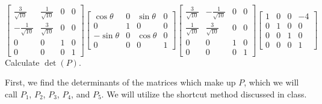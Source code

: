 \documentclass[11pt]{article}
\begin{document}
\begin{enumerate}[label=\textbf{\arabic*.}]
{\begin{enumerate}[label=\textbf{(\alph*)}]
{{{$$                        \begin{bmatrix}
                            \frac{3}{\sqrt{10}}  & \frac{1}{\sqrt{10}} & 0 & 0 \\
                            -\frac{1}{\sqrt{10}} & \frac{3}{\sqrt{10}} & 0 & 0 \\
                            0                    & 0                   & 1 & 0 \\
                            0                    & 0                   & 0 & 1
                        \end{bmatrix}
                        \begin{bmatrix}
                            \cos\theta  & 0 & \sin\theta & 0 \\
                            0           & 1 & 0          & 0 \\
                            -\sin\theta & 0 & \cos\theta & 0 \\
                            0           & 0 & 0          & 1
                        \end{bmatrix}
                        \begin{bmatrix}
                            \frac{3}{\sqrt{10}} & -\frac{1}{\sqrt{10}} & 0 & 0 \\
                            \frac{1}{\sqrt{10}} & \frac{3}{\sqrt{10}}  & 0 & 0 \\
                            0                   & 0                    & 1 & 0 \\
                            0                   & 0                    & 0 & 1
                        \end{bmatrix}
                        \begin{bmatrix}
                            1 & 0 & 0 & -4 \\
                            0 & 1 & 0 & 0  \\
                            0 & 0 & 1 & 0  \\
                            0 & 0 & 0 & 1
                        \end{bmatrix}
                    $$
                    }
                    Calculate $\det(P)$.
                    }
                    \par
                    First, we find the determinants of the matrices which make up $P$, which we will call $P_1$, $P_2$, $P_3$, $P_4$, and $P_5$. We will utilize the shortcut method discussed in class.
                    \begin{align*}

\end{align*}}
\end{enumerate}}
\end{enumerate}
\end{document}
